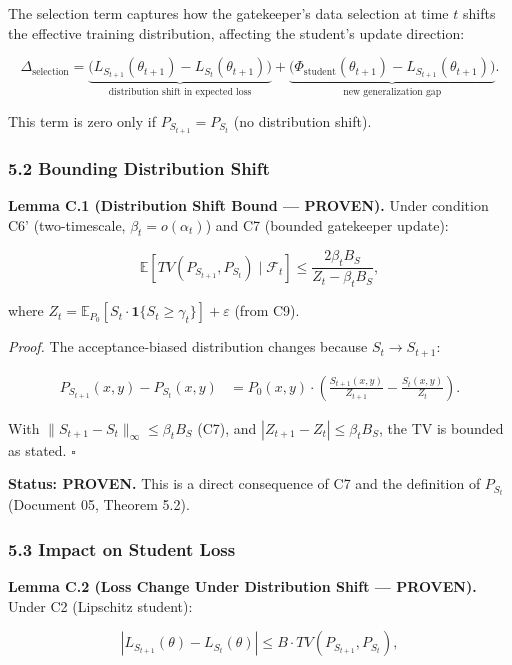 \documentclass[
  12pt,
]{article}
\begin{document}
The selection term captures how the gatekeeper's data selection at time
\(t\) shifts the effective training distribution, affecting the
student's update direction:

\[\Delta_{\text{selection}} = \underbrace{\bigl(L_{S_{t+1}}(\theta_{t+1}) - L_{S_t}(\theta_{t+1})\bigr)}_{\text{distribution shift in expected loss}} + \underbrace{\bigl(\Phi_{\text{student}}(\theta_{t+1}) - L_{S_{t+1}}(\theta_{t+1})\bigr)}_{\text{new generalization gap}}.\]

This term is zero only if \(P_{S_{t+1}} = P_{S_t}\) (no distribution
shift).

\subsubsection{5.2 Bounding Distribution
Shift}\label{bounding-distribution-shift}

\textbf{Lemma C.1 (Distribution Shift Bound --- PROVEN).} Under
condition C6' (two-timescale, \(\beta_t = o(\alpha_t)\)) and C7 (bounded
gatekeeper update):

\[\mathbb{E}[TV(P_{S_{t+1}}, P_{S_t}) \mid \mathcal{F}_t] \leq \frac{2\beta_t B_S}{Z_t - \beta_t B_S},\]

where
\(Z_t = \mathbb{E}_{P_0}[S_t \cdot \mathbf{1}\{S_t \geq \gamma_t\}] + \varepsilon\)
(from C9).

\emph{Proof.} The acceptance-biased distribution changes because
\(S_t \to S_{t+1}\):

\[\begin{aligned}
P_{S_{t+1}}(x,y) - P_{S_t}(x,y) &= P_0(x,y) \cdot \left(\frac{S_{t+1}(x,y)}{Z_{t+1}} - \frac{S_t(x,y)}{Z_t}\right).
\end{aligned}\]

With \(\|S_{t+1} - S_t\|_\infty \leq \beta_t B_S\) (C7), and
\(|Z_{t+1} - Z_t| \leq \beta_t B_S\), the TV is bounded as stated.
\(\square\)

\textbf{Status: PROVEN.} This is a direct consequence of C7 and the
definition of \(P_{S_t}\) (Document 05, Theorem 5.2).

\subsubsection{5.3 Impact on Student Loss}\label{impact-on-student-loss}

\textbf{Lemma C.2 (Loss Change Under Distribution Shift --- PROVEN).}
Under C2 (Lipschitz student):

\[|L_{S_{t+1}}(\theta) - L_{S_t}(\theta)| \leq B \cdot TV(P_{S_{t+1}}, P_{S_t}),\]
\end{document}

